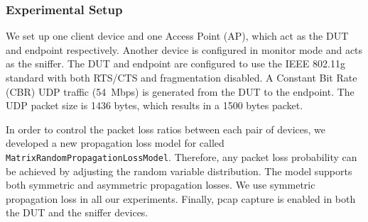 \subsubsection{Experimental Setup}

We set up one \wifi{} client device and one Access Point (AP), which act as the DUT
and endpoint respectively.
%
Another \wifi{} device is configured in monitor mode and acts as the sniffer.
%
The DUT and endpoint are configured to use
the IEEE 802.11g standard with both RTS/CTS and fragmentation disabled.
%
A Constant Bit
Rate (CBR) UDP traffic (54~Mbps) is generated from the DUT to the endpoint.
%
The UDP packet size is 1436 bytes, which results in a 1500 bytes \wifi{} packet.

In order to control the packet loss ratios between each pair of devices, we
developed a new propagation loss model for \ns{} called
\texttt{MatrixRandomPropagationLossModel}.
%
%
Therefore, any packet loss
probability can be achieved by adjusting the random variable distribution.
%
The
model supports both symmetric and asymmetric propagation losses.
%
We use
symmetric propagation loss in all our experiments.
%
Finally, pcap capture is enabled in both the DUT and the sniffer devices.


